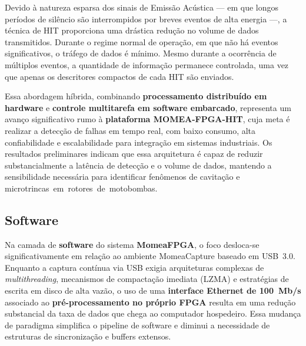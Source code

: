 Devido à natureza esparsa dos sinais de Emissão Acústica — em que longos períodos de silêncio são interrompidos por breves eventos de alta energia —, a técnica de HIT proporciona uma drástica redução no volume de dados transmitidos. Durante o regime normal de operação, em que não há eventos significativos, o tráfego de dados é mínimo. Mesmo durante a ocorrência de múltiplos eventos, a quantidade de informação permanece controlada, uma vez que apenas os descritores compactos de cada HIT são enviados.

Essa abordagem híbrida, combinando \textbf{processamento distribuído em hardware} e \textbf{controle multitarefa em software embarcado}, representa um avanço significativo rumo à \textbf{plataforma MOMEA-FPGA-HIT}, cuja meta é realizar a detecção de falhas em tempo real, com baixo consumo, alta confiabilidade e escalabilidade para integração em sistemas industriais. Os resultados preliminares indicam que essa arquitetura é capaz de reduzir substancialmente a latência de detecção e o volume de dados, mantendo a sensibilidade necessária para identificar fenômenos de cavitação e \mbox{microtrincas em rotores de motobombas.}

\subsection{Software}

Na camada de \textbf{software} do sistema \textbf{MomeaFPGA}, o foco desloca-se significativamente em relação ao ambiente MomeaCapture baseado em USB~3.0. Enquanto a captura contínua via USB exigia arquiteturas complexas de \textit{multithreading}, mecanismos de compactação imediata (LZMA) e estratégias de escrita em disco de alta vazão, o uso de uma \textbf{interface Ethernet de 100~Mb/s} associado ao \textbf{pré-processamento no próprio FPGA} resulta em uma redução substancial da taxa de dados que chega ao computador hospedeiro. Essa mudança de paradigma simplifica o pipeline de software e diminui a necessidade de estruturas de sincronização e buffers extensos.

